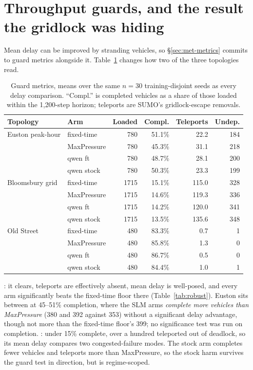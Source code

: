 \section{Throughput guards, and the result the gridlock was hiding}\label{sec:res-guards}
\label{sec:res-calib}
Mean delay can be improved by stranding vehicles, so \S\ref{sec:met-metrics}
commits to guard metrics alongside it. Table~\ref{tab:guards} changes how
two of the three topologies read.

\begin{table}[h]
\caption{Guard metrics, means over the same $n{=}30$ training-disjoint
seeds as every delay comparison. ``Compl.'' is completed vehicles as a share of those loaded
within the 1{,}200-step horizon; teleports are SUMO's gridlock-escape
removals.}
\label{tab:guards}
\centering
\small
\begin{tabular}{llrrrr}
\toprule
Topology & Arm & Loaded & Compl. & Teleports & Undep. \\
\midrule
Euston peak-hour & fixed-time & 780 & 51.1\% & 22.2 & 184 \\
 & MaxPressure & 780 & 45.3\% & 31.1 & 218 \\
 & qwen ft & 780 & 48.7\% & 28.1 & 200 \\
 & qwen stock & 780 & 50.3\% & 23.3 & 199 \\
Bloomsbury grid & fixed-time & 1715 & 15.1\% & 115.0 & 328 \\
 & MaxPressure & 1715 & 14.6\% & 119.3 & 336 \\
 & qwen ft & 1715 & 14.2\% & 120.0 & 341 \\
 & qwen stock & 1715 & 13.5\% & 135.6 & 348 \\
Old Street & fixed-time & 480 & 83.3\% & 0.7 & 1 \\
 & MaxPressure & 480 & 85.8\% & 1.3 & 0 \\
 & qwen ft & 480 & 86.7\% & 0.5 & 0 \\
 & qwen stock & 480 & 84.4\% & 1.0 & 1 \\
\bottomrule
\end{tabular}
\end{table}

: it clears, teleports are effectively absent, mean
delay is well-posed, and every arm significantly beats the
fixed-time floor there (Table~\ref{tab:robust}). Euston sits between at 45--51\% completion,
where the SLM arms \emph{complete more vehicles than MaxPressure} (380 and
392 against 353) without a significant delay advantage, though not more than the
fixed-time floor's 399; no significance test was run on
completion.
: under 15\% complete, over a
hundred teleported out of deadlock, so its mean delay compares two
congested-failure modes. The stock arm completes fewer vehicles and
teleports more than MaxPressure, so the stock harm survives the guard test
in direction, but is regime-scoped.

